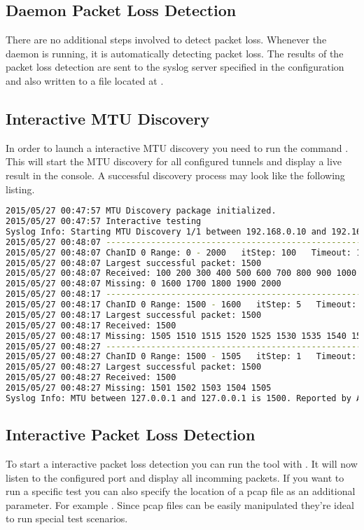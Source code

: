 \subsection{Daemon Packet Loss Detection}
There are no additional steps involved to detect packet loss. Whenever the daemon is running, it is automatically detecting packet loss. The results of the packet loss detection are sent to the syslog server specified in the configuration and also written to a file located at .

\subsection{Interactive MTU Discovery}
In order to launch a interactive \acs{MTU} discovery you need to run the command . This will start the \acs{MTU} discovery for all configured tunnels and display a live result in the console. A successful discovery process may look like the following listing.

\begin{lstlisting}[language=bash, caption=Successful MTU Discovery]
2015/05/27 00:47:57 MTU Discovery package initialized.
2015/05/27 00:47:57 Interactive testing
Syslog Info: Starting MTU Discovery 1/1 between 192.168.0.10 and 192.168.0.11. Reported by AppID 97691.
2015/05/27 00:48:07 ---------------------------------------------------
2015/05/27 00:48:07 ChanID 0 Range: 0 - 2000   itStep: 100   Timeout: 10ns
2015/05/27 00:48:07 Largest successful packet: 1500
2015/05/27 00:48:07 Received: 100 200 300 400 500 600 700 800 900 1000 1100 1200 1300 1400 1500 
2015/05/27 00:48:07 Missing: 0 1600 1700 1800 1900 2000 
2015/05/27 00:48:17 ---------------------------------------------------
2015/05/27 00:48:17 ChanID 0 Range: 1500 - 1600   itStep: 5   Timeout: 10ns
2015/05/27 00:48:17 Largest successful packet: 1500
2015/05/27 00:48:17 Received: 1500 
2015/05/27 00:48:17 Missing: 1505 1510 1515 1520 1525 1530 1535 1540 1545 1550 1555 1560 1565 1570 1575 1580 1585 1590 1595 1600 
2015/05/27 00:48:27 ---------------------------------------------------
2015/05/27 00:48:27 ChanID 0 Range: 1500 - 1505   itStep: 1   Timeout: 10ns
2015/05/27 00:48:27 Largest successful packet: 1500
2015/05/27 00:48:27 Received: 1500 
2015/05/27 00:48:27 Missing: 1501 1502 1503 1504 1505 
Syslog Info: MTU between 127.0.0.1 and 127.0.0.1 is 1500. Reported by AppID 97691.
\end{lstlisting}

\subsection{Interactive Packet Loss Detection}
To start a interactive packet loss detection you can run the tool with . It will now listen to the configured port and display all incomming packets. If you want to run a specific test you can also specify the location of a pcap file as an additional parameter. For example . Since pcap files can be easily manipulated they're ideal to run special test scenarios.

